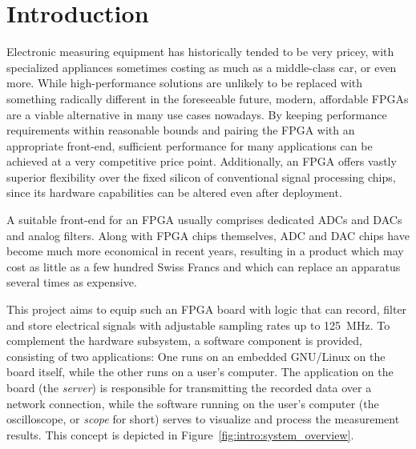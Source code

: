 %
%
\chapter*{Introduction} %
\label{ch:intro}

Electronic measuring equipment has historically tended to be very pricey, with
specialized appliances  sometimes costing  as much as  a middle-class  car, or
even more. While high-performance  solutions are unlikely to  be replaced with
something radically  different in  the foreseeable future,  modern, affordable
FPGAs  are  a  viable  alternative  in many  use  cases  nowadays. By  keeping
performance requirements within reasonable bounds and pairing the FPGA with an
appropriate  front-end, sufficient  performance for  many applications  can be
achieved  at a  very competitive  price point.   Additionally, an  FPGA offers
vastly  superior flexibility  over the  fixed silicon  of conventional  signal
processing chips,  since its hardware  capabilities can be altered  even after
deployment.

A suitable front-end for an FPGA usually comprises dedicated ADCs and DACs and
analog  filters. Along with  FPGA chips  themselves,  ADC and  DAC chips  have
become much more economical in recent  years, resulting in a product which may
cost  as little  as  a few  hundred  Swiss  Francs and  which  can replace  an
apparatus several times as expensive.

This project  aims to  equip such an  FPGA board with  logic that  can record,
filter  and store  electrical signals  with  adjustable sampling  rates up  to
\SI{125}{\mega\hertz}.   To  complement  the hardware  subsystem,  a  software
component is provided, consisting of two applications: One runs on an embedded
GNU/Linux on the board itself, while  the other runs on a user's computer. The
application on the  board (the \emph{server}) is  responsible for transmitting
the recorded data over a network connection, while the software running on the
user's  computer  (the oscilloscope,  or  \emph{scope}  for short)  serves  to
visualize and  process the  measurement results. This  concept is  depicted in
Figure~\ref{fig:intro:system_overview}.

